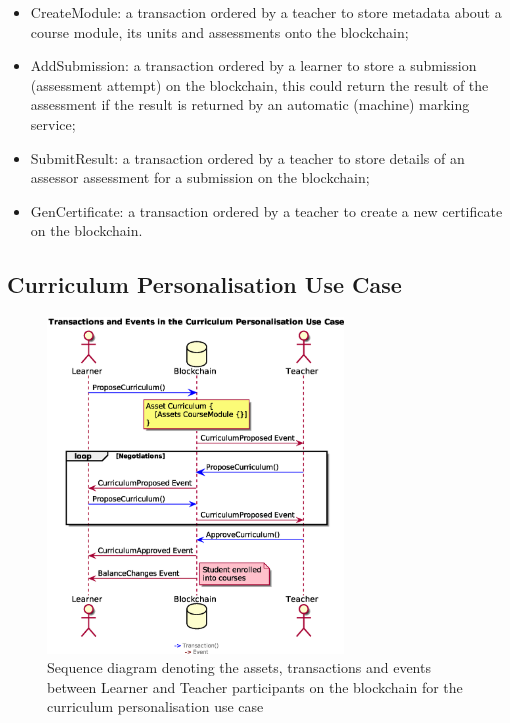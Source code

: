 \begin{itemize}
	\setlength\itemsep{0em}
	\item CreateModule: a transaction ordered by a teacher to store metadata about a course module,
	      its units and assessments onto the blockchain;
	\item AddSubmission: a transaction ordered by a learner to store a submission (assessment attempt)
	      on the blockchain, this could return the result of the assessment if the result is returned by
	      an automatic (machine) marking service;
	\item SubmitResult: a transaction ordered by a teacher to store details of an assessor assessment
	      for a submission on the blockchain;
	\item GenCertificate: a transaction ordered by a teacher to create a new certificate on the blockchain.
\end{itemize}

\subsection{Curriculum Personalisation Use Case}

\begin{figure}[!ht]
	\centering
	\includegraphics[width=0.7\textwidth]{personalisationloop}
	\caption[Curriculum Personalisation Use Case]
	{Sequence diagram denoting the assets, transactions and events between
		Learner and Teacher participants on the blockchain for the curriculum personalisation use case}
	\label{fig:personalisationloop}
\end{figure}

